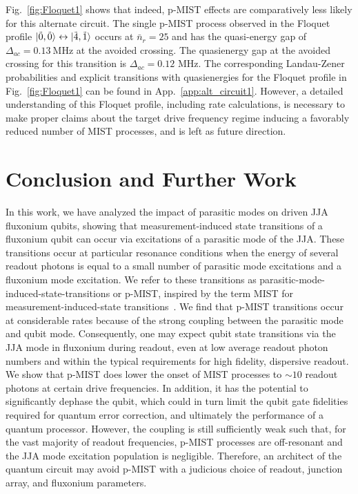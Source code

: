 \documentclass[%
reprint,
superscriptaddress,
 amsmath,amssymb,
 aps,
 prx,
longbibliography,
floatfix,
]{revtex4-2}
\begin{document}
Fig.~\ref{fig:Floquet1} shows that indeed, p-MIST effects are comparatively less likely for this alternate circuit. The single p-MIST process observed in the Floquet profile $\ket{\tilde{0},\tilde{0}}\leftrightarrow\ket{\tilde{4},\tilde{1}}$ occurs at $\bar n_r=25$ and has the quasi-energy gap of $\Delta_{ac}=0.13 \ \mathrm{MHz}$ at the avoided crossing. The quasienergy gap at the avoided crossing for this transition is $\Delta_{ac}=0.12$ MHz. The corresponding Landau-Zener probabilities and explicit transitions with quasienergies for the Floquet profile in Fig.~\ref{fig:Floquet1} can be found in App.~\ref{app:alt_circuit1}. However, a detailed understanding of this Floquet profile, including rate calculations, is necessary to make proper claims about the target drive frequency regime inducing a favorably reduced number of MIST processes, and is left as future direction.

\section{Conclusion and Further Work}\label{sec:conclusion}
In this work, we have analyzed the impact of parasitic modes on driven JJA fluxonium qubits, showing that measurement-induced state transitions of a fluxonium qubit can occur via excitations of a parasitic mode of the JJA. These transitions occur at particular resonance conditions when the energy of several readout photons is equal to a small number of parasitic mode excitations and a fluxonium mode excitation.  
We refer to these transitions as parasitic-mode-induced-state-transitions or p-MIST, inspired by the term MIST for measurement-induced-state transitions~\cite{sank2016measurement}. We find that p-MIST transitions occur at considerable rates because of the strong coupling between the parasitic mode and qubit mode. Consequently, one may expect qubit state transitions via the JJA mode in fluxonium during readout, even at low average readout photon numbers and within the typical requirements for high fidelity, dispersive readout. We show that p-MIST does lower the onset of MIST processes to $\sim 10$ readout photons at certain drive frequencies. In addition, it has the potential to significantly dephase the qubit, which could in turn limit the qubit gate fidelities required for quantum error correction, and ultimately the performance of a quantum processor. However, the coupling is still sufficiently weak such that, for the vast majority of readout frequencies, p-MIST processes are off-resonant and the JJA mode excitation population is negligible. Therefore, an architect of the quantum circuit may avoid p-MIST with a judicious choice of readout, junction array, and fluxonium parameters.
\end{document}
